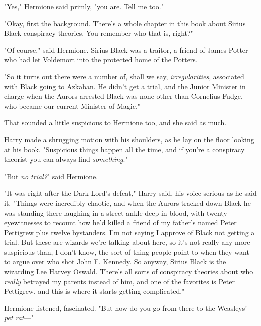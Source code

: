 "Yes," Hermione said primly, "you are. Tell me too."

"Okay, first the background. There's a whole chapter in this book about Sirius 
Black conspiracy theories. You remember who that is, right?"

"Of course," said Hermione. Sirius Black was a traitor, a friend of James 
Potter who had let Voldemort into the protected home of the Potters.

"So it turns out there were a number of, shall we say, \emph{irregularities}, 
associated with Black going to Azkaban. He didn't get a trial, and the Junior 
Minister in charge when the Aurors arrested Black was none other than Cornelius 
Fudge, who became our current Minister of Magic."

That sounded a little suspicious to Hermione too, and she said as much.

Harry made a shrugging motion with his shoulders, as he lay on the floor 
looking at his book. "Suspicious things happen all the time, and if you're a 
conspiracy theorist you can always find \emph{something}."

"But \emph{no trial?}" said Hermione.

"It was right after the Dark Lord's defeat," Harry said, his voice serious as 
he said it. "Things were incredibly chaotic, and when the Aurors tracked down 
Black he was standing there laughing in a street ankle-deep in blood, with 
twenty eyewitnesses to recount how he'd killed a friend of my father's named 
Peter Pettigrew plus twelve bystanders. I'm not saying I approve of Black not 
getting a trial. But these are wizards we're talking about here, so it's not 
really any more suspicious than, I don't know, the sort of thing people point 
to when they want to argue over who shot John F. Kennedy. So anyway, Sirius 
Black is the wizarding Lee Harvey Oswald. There's all sorts of conspiracy 
theories about who \emph{really} betrayed my parents instead of him, and one of 
the favorites is Peter Pettigrew, and this is where it starts getting 
complicated."

Hermione listened, fascinated. "But how do you go from there to the Weasleys' 
\emph{pet rat}---"

